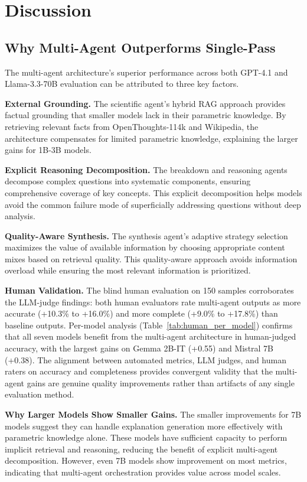 \section{Discussion}\label{sec:discussion}

\subsection{Why Multi-Agent Outperforms Single-Pass}

The multi-agent architecture's superior performance across both GPT-4.1 and Llama-3.3-70B evaluation can be attributed to three key factors.

\textbf{External Grounding.} The scientific agent's hybrid RAG approach provides factual grounding that smaller models lack in their parametric knowledge. By retrieving relevant facts from OpenThoughts-114k and Wikipedia, the architecture compensates for limited parametric knowledge, explaining the larger gains for 1B-3B models.

\textbf{Explicit Reasoning Decomposition.} The breakdown and reasoning agents decompose complex questions into systematic components, ensuring comprehensive coverage of key concepts. This explicit decomposition helps models avoid the common failure mode of superficially addressing questions without deep analysis.

\textbf{Quality-Aware Synthesis.} The synthesis agent's adaptive strategy selection maximizes the value of available information by choosing appropriate content mixes based on retrieval quality. This quality-aware approach avoids information overload while ensuring the most relevant information is prioritized.

\textbf{Human Validation.} The blind human evaluation on 150 samples corroborates the LLM-judge findings: both human evaluators rate multi-agent outputs as more accurate (+10.3\% to +16.0\%) and more complete (+9.0\% to +17.8\%) than baseline outputs. Per-model analysis (Table~\ref{tab:human_per_model}) confirms that all seven models benefit from the multi-agent architecture in human-judged accuracy, with the largest gains on Gemma 2B-IT (+0.55) and Mistral 7B (+0.38). The alignment between automated metrics, LLM judges, and human raters on accuracy and completeness provides convergent validity that the multi-agent gains are genuine quality improvements rather than artifacts of any single evaluation method.

\textbf{Why Larger Models Show Smaller Gains.} The smaller improvements for 7B models suggest they can handle explanation generation more effectively with parametric knowledge alone. These models have sufficient capacity to perform implicit retrieval and reasoning, reducing the benefit of explicit multi-agent decomposition. However, even 7B models show improvement on most metrics, indicating that multi-agent orchestration provides value across model scales.

